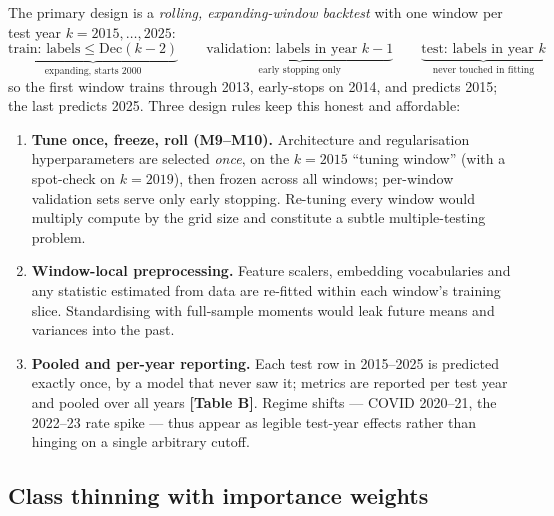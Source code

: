 \documentclass[11pt,a4paper]{article}
\newcommand{\artifact}[1]{\textbf{[#1]}}
\begin{document}
The primary design is a \emph{rolling, expanding-window backtest} with one window per test year $k = 2015,\dots,2025$:
\[
\underbrace{\text{train: labels} \le \mathrm{Dec}(k{-}2)}_{\text{expanding, starts 2000}}
\qquad
\underbrace{\text{validation: labels in year } k{-}1}_{\text{early stopping only}}
\qquad
\underbrace{\text{test: labels in year } k}_{\text{never touched in fitting}}
\]
so the first window trains through 2013, early-stops on 2014, and predicts 2015; the last predicts 2025. Three design rules keep this honest and affordable:
\begin{enumerate}[itemsep=2pt]
\item \textbf{Tune once, freeze, roll (M9--M10).} Architecture and regularisation hyperparameters are selected \emph{once}, on the $k{=}2015$ ``tuning window'' (with a spot-check on $k{=}2019$), then frozen across all windows; per-window validation sets serve only early stopping. Re-tuning every window would multiply compute by the grid size and constitute a subtle multiple-testing problem.
\item \textbf{Window-local preprocessing.} Feature scalers, embedding vocabularies and any statistic estimated from data are re-fitted within each window's training slice. Standardising with full-sample moments would leak future means and variances into the past.
\item \textbf{Pooled and per-year reporting.} Each test row in 2015--2025 is predicted exactly once, by a model that never saw it; metrics are reported per test year and pooled over all years \artifact{Table B}. Regime shifts --- COVID 2020--21, the 2022--23 rate spike --- thus appear as legible test-year effects rather than hinging on a single arbitrary cutoff.
\end{enumerate}

\subsection{Class thinning with importance weights}\label{sec:thinning}
\end{document}
